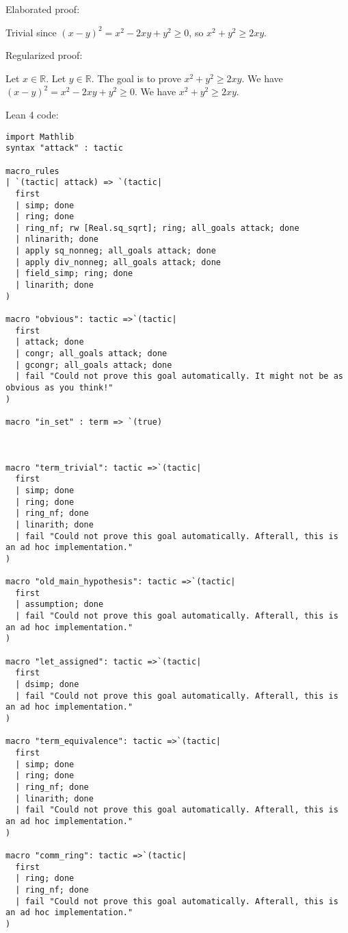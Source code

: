 \documentclass{article}
\begin{document}
Elaborated proof:
\begin{tcolorbox}[colback=green!10, width=\linewidth]
Trivial since $(x-y)^2 = x^2 -2xy + y^2 \ge 0$, so $x^2 + y^2 \ge 2xy$.
\end{tcolorbox}

Regularized proof:
\begin{tcolorbox}[colback=red!10, width=\linewidth]
Let $x\in\mathbb{R}$.
Let $y\in\mathbb{R}$.
The goal is to prove $x^2 + y^2 \ge 2xy$.
We have ${{(x-y)}}^2 = x^2 -2xy + y^2 \ge 0$.
We have $x^2 + y^2 \ge 2xy$.
\end{tcolorbox}

Lean 4 code:
\begin{tcolorbox}[colback=white!10, width=\linewidth]
\begin{lstlisting}[language=Lean4]
import Mathlib
syntax "attack" : tactic

macro_rules
| `(tactic| attack) => `(tactic|
  first
  | simp; done
  | ring; done
  | ring_nf; rw [Real.sq_sqrt]; ring; all_goals attack; done
  | nlinarith; done
  | apply sq_nonneg; all_goals attack; done
  | apply div_nonneg; all_goals attack; done
  | field_simp; ring; done
  | linarith; done
)

macro "obvious": tactic =>`(tactic|
  first
  | attack; done
  | congr; all_goals attack; done
  | gcongr; all_goals attack; done
  | fail "Could not prove this goal automatically. It might not be as obvious as you think!"
)

macro "in_set" : term => `(true)



macro "term_trivial": tactic =>`(tactic|
  first
  | simp; done
  | ring; done
  | ring_nf; done
  | linarith; done
  | fail "Could not prove this goal automatically. Afterall, this is an ad hoc implementation."
)

macro "old_main_hypothesis": tactic =>`(tactic|
  first
  | assumption; done
  | fail "Could not prove this goal automatically. Afterall, this is an ad hoc implementation."
)

macro "let_assigned": tactic =>`(tactic|
  first
  | dsimp; done
  | fail "Could not prove this goal automatically. Afterall, this is an ad hoc implementation."
)

macro "term_equivalence": tactic =>`(tactic|
  first
  | simp; done
  | ring; done
  | ring_nf; done
  | linarith; done
  | fail "Could not prove this goal automatically. Afterall, this is an ad hoc implementation."
)

macro "comm_ring": tactic =>`(tactic|
  first
  | ring; done
  | ring_nf; done
  | fail "Could not prove this goal automatically. Afterall, this is an ad hoc implementation."
)


\end{lstlisting}
\end{tcolorbox}
\end{document}
